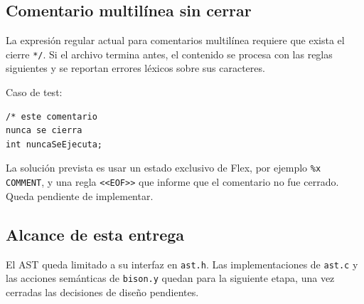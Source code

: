 \documentclass[11pt,a4paper]{article}
\begin{document}
\subsection{Comentario multilínea sin cerrar}

La expresión regular actual para comentarios multilínea requiere que exista
el cierre \texttt{*/}. Si el archivo termina antes, el contenido se procesa
con las reglas siguientes y se reportan errores léxicos sobre sus caracteres.

Caso de test:

\begin{verbatim}
/* este comentario
nunca se cierra
int nuncaSeEjecuta;
\end{verbatim}

La solución prevista es usar un estado exclusivo de Flex, por ejemplo
\texttt{\%x COMMENT}, y una regla \texttt{<<EOF>>} que informe que el
comentario no fue cerrado. Queda pendiente de implementar.

\subsection{Alcance de esta entrega}

El AST queda limitado a su interfaz en \texttt{ast.h}. Las implementaciones de
\texttt{ast.c} y las acciones semánticas de \texttt{bison.y} quedan para la
siguiente etapa, una vez cerradas las decisiones de diseño pendientes.
\end{document}

